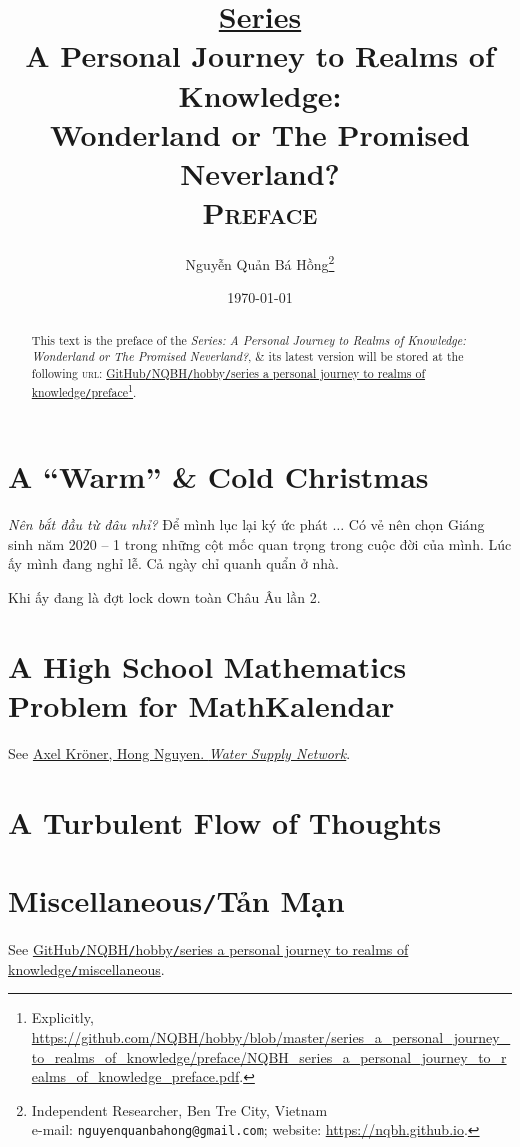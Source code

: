 \documentclass{article}
\title{\underline{\textbf{Series}}\\A Personal Journey to Realms of Knowledge:\\Wonderland or The Promised Neverland?\\\textsc{Preface}}
\author{\selectlanguage{vietnamese} Nguyễn Quản Bá Hồng\footnote{Independent Researcher, Ben Tre City, Vietnam\\e-mail: \texttt{nguyenquanbahong@gmail.com}; website: \url{https://nqbh.github.io}.}}
\date{\today}
\numberwithin{equation}{section}
\begin{document}
\maketitle
{}
\begin{abstract}
	This text is the preface of the \textit{Series: A Personal Journey to Realms of Knowledge: Wonderland or The Promised Neverland?}, \& its latest version will be stored at the following \textsc{url}: \href{https://github.com/NQBH/hobby/blob/master/series_a_personal_journey_to_realms_of_knowledge/preface/NQBH_series_a_personal_journey_to_realms_of_knowledge_preface.pdf}{GitHub\texttt{/}NQBH\texttt{/}hobby\texttt{/}series a personal journey to realms of knowledge\texttt{/}preface}\footnote{Explicitly, \url{https://github.com/NQBH/hobby/blob/master/series_a_personal_journey_to_realms_of_knowledge/preface/NQBH_series_a_personal_journey_to_realms_of_knowledge_preface.pdf}.}.
\end{abstract}

\tableofcontents
{}


\section{A ``Warm'' \& Cold Christmas}
\textit{Nên bắt đầu từ đâu nhỉ?} Để mình lục lại ký ức phát $\ldots$ Có vẻ nên chọn Giáng sinh năm 2020 -- 1 trong những cột mốc quan trọng trong cuộc đời của mình. Lúc ấy mình đang nghỉ lễ. Cả ngày chỉ quanh quẩn ở nhà.

Khi ấy đang là đợt lock down toàn Châu Âu lần 2.

\section{A High School Mathematics Problem for MathKalendar}
See \href{https://github.com/NQBH/WIAS/blob/master/math\_calendar/MK-Year-Author-Title-en.pdf}{Axel Kr\"oner, Hong Nguyen. \textit{Water Supply Network}}.

\section{A Turbulent Flow of Thoughts}

\section{Miscellaneous\texttt{/}Tản Mạn}
See \href{https://github.com/NQBH/hobby/blob/master/series_a_personal_journey_to_realms_of_knowledge/miscellaneous/NQBH_series_a_personal_journey_to_realms_of_knowledge_miscellaneous.pdf}{GitHub\texttt{/}NQBH\texttt{/}hobby\texttt{/}series a personal journey to realms of knowledge\texttt{/}miscellaneous}.




\printbibliography[heading=bibintoc]	
	
\end{document}
